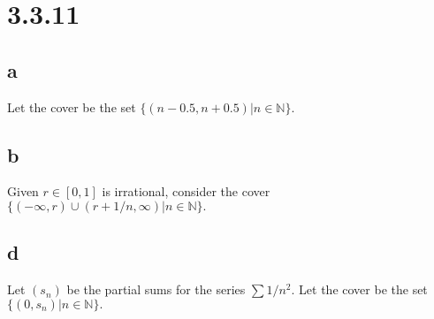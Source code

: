 \documentclass[10pt]{article}
\begin{document}
\section*{3.3.11}

\subsection*{a}
Let the cover be the set $\{(n-0.5,n+0.5)|n\in\mathbb{N}\}.$
\subsection*{b}
Given $r\in [0,1]$ is irrational,
consider the cover $\{(-\infty, r)\cup(r+1/n,\infty)|n\in\mathbb{N}\}.$
\subsection*{d}
Let $(s_n)$ be the partial sums for the series $\sum 1/n^2.$ Let the cover be the set $\{(0, s_n)|n\in\mathbb{N}\}.$

 
\end{document}
